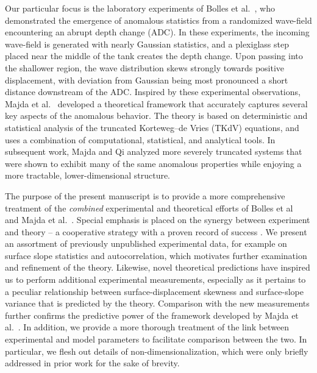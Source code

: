 \documentclass[11pt]{article}
\begin{document}
Our particular focus is the laboratory experiments of Bolles et al.~\cite{bolles2019}, who demonstrated the emergence of anomalous statistics from a randomized wave-field encountering an abrupt depth change (ADC). In these experiments, the incoming wave-field is generated with nearly Gaussian statistics, and a plexiglass step placed near the middle of the tank creates the depth change. Upon passing into the shallower region, the wave distribution skews strongly towards positive displacement, with deviation from Gaussian being most pronounced a short distance downstream of the ADC. Inspired by these experimental observations, Majda et al.~\cite{majda2019} developed a theoretical framework that accurately captures several key aspects of the anomalous behavior. The theory is based on deterministic and statistical analysis of the truncated Korteweg–de Vries (TKdV) equations, and uses a combination of computational, statistical, and analytical tools. In subsequent work, Majda and Qi \cite{majdaqi2019} analyzed more severely truncated systems that were shown to exhibit many of the same anomalous properties while enjoying a more tractable, lower-dimensional structure.

The purpose of the present manuscript is to provide a more comprehensive treatment of the {\em combined} experimental and theoretical efforts of Bolles et al~\cite{bolles2019} and Majda et al.~\cite{majda2019, majdaqi2019}. Special emphasis is placed on the synergy between experiment and theory -- a cooperative strategy with a proven record of success \cite{camassa2012stratified, ristroph2012, ganedi2018equilibrium}. We present an assortment of previously unpublished experimental data, for example on surface slope statistics and autocorrelation, which motivates further examination and refinement of the theory. Likewise, novel theoretical predictions have inspired us to perform additional experimental measurements, especially as it pertains to a peculiar relationship between surface-displacement skewness and surface-slope variance that is predicted by the theory. Comparison with the new measurements further confirms the predictive power of the framework developed by Majda et al.~\cite{majda2019}. In addition, we provide a more thorough treatment of the link between experimental and model parameters to facilitate comparison between the two. In particular, we flesh out details of non-dimensionalization, which were only briefly addressed in prior work for the sake of brevity.

\end{document}
